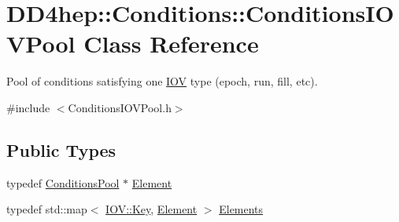 \hypertarget{class_d_d4hep_1_1_conditions_1_1_conditions_i_o_v_pool}{
\section{DD4hep::Conditions::ConditionsIOVPool Class Reference}
\label{class_d_d4hep_1_1_conditions_1_1_conditions_i_o_v_pool}
}


Pool of conditions satisfying one \hyperlink{class_d_d4hep_1_1_i_o_v}{IOV} type (epoch, run, fill, etc).  


{\ttfamily \#include $<$ConditionsIOVPool.h$>$}\subsection*{Public Types}
\begin{DoxyCompactItemize}
\item 
typedef \hyperlink{class_d_d4hep_1_1_conditions_1_1_conditions_pool}{ConditionsPool} $\ast$ \hyperlink{class_d_d4hep_1_1_conditions_1_1_conditions_i_o_v_pool_a41146867e220b8f23ef69afe5f724914}{Element}
\item 
typedef std::map$<$ \hyperlink{class_d_d4hep_1_1_i_o_v_a07cb46dc875296dc9cccf4ff370104ae}{IOV::Key}, \hyperlink{class_d_d4hep_1_1_conditions_1_1_conditions_pool}{Element} $>$ \hyperlink{class_d_d4hep_1_1_conditions_1_1_conditions_i_o_v_pool_aa011c5cc19bfb761be62adf9a88b5ee9}{Elements}
\end{DoxyCompactItemize}
